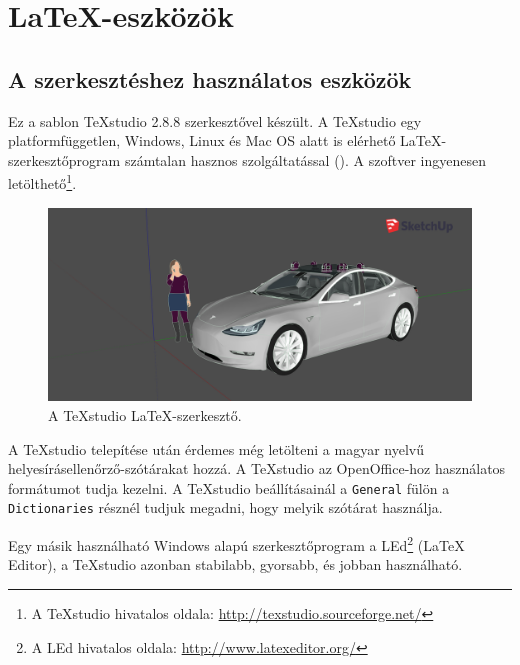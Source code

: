 \chapter{\LaTeX-eszközök}
\label{sec:LatexTools}
\section{A szerkesztéshez használatos eszközök}
Ez a sablon TeXstudio 2.8.8 szerkesztővel készült. A TeXstudio egy
platformfüggetlen, Windows, Linux és Mac OS alatt is elérhető
\LaTeX-szerkesztőprogram számtalan hasznos szolgáltatással
(). A szoftver ingyenesen letölthető\footnote{A
TeXstudio hivatalos oldala: \url{http://texstudio.sourceforge.net/}}.

\begin{figure}[!ht]
\centering
\includegraphics[width=150mm, keepaspectratio]{figures/3dmodel1.png}
\caption{A TeXstudio \LaTeX-szerkesztő.}
\label{fig:TeXstudio}
\end{figure}

A TeXstudio telepítése után érdemes még letölteni a magyar nyelvű
helyesírásellenőrző-szótárakat hozzá. A TeXstudio az OpenOffice-hoz használatos
formátumot tudja kezelni. A TeXstudio beállításainál a \verb+General+ fülön a
\verb+Dictionaries+ résznél tudjuk megadni, hogy melyik szótárat használja.

Egy másik használható Windows alapú szerkesztőprogram a LEd\footnote{A LEd
hivatalos oldala: \url{http://www.latexeditor.org/}} (LaTeX Editor), a TeXstudio
azonban stabilabb, gyorsabb, és jobban használható.

